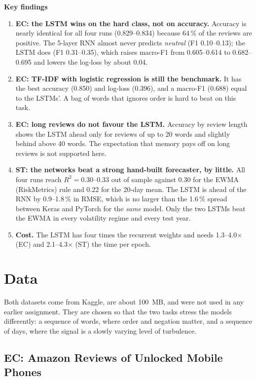 \documentclass[11pt, a4paper]{article}
\begin{document}
\textbf{Key findings}
\begin{enumerate}
\item \textbf{EC: the LSTM wins on the hard class, not on accuracy.} Accuracy is nearly identical for all four runs (0.829--0.834) because 64\,\% of the reviews are positive. The 5-layer RNN almost never
  predicts \emph{neutral} (F1 0.10--0.13); the LSTM does (F1 0.31--0.35), which raises macro-F1 from 0.605--0.614 to 0.682--0.695 and lowers the log-loss by about 0.04.
\item \textbf{EC: TF-IDF with logistic regression is still the benchmark.} It has the best accuracy (0.850) and log-loss (0.396), and a macro-F1 (0.688) equal to the LSTMs'. A bag of words that ignores order is hard to beat on this task.
\item \textbf{EC: long reviews do not favour the LSTM.} Accuracy by review length shows the LSTM ahead only for reviews of up to 20 words and slightly behind above 40 words. The expectation that memory pays off on long reviews is not supported here.
\item \textbf{ST: the networks beat a strong hand-built forecaster, by little.} All four runs reach $R^2=0.30$--$0.33$ out of sample against 0.30 for the EWMA (RiskMetrics) rule and 0.22 for the 20-day mean. The LSTM is ahead of the RNN by 0.9--1.8\,\% in RMSE,
  which is no larger than the 1.6\,\% spread between Keras and PyTorch for the \emph{same} model. Only the two LSTMs beat the EWMA in every volatility regime and every test year.
\item \textbf{Cost.} The LSTM has four times the recurrent weights and needs 1.3--4.0$\times$ (EC) and 2.1--4.3$\times$ (ST) the time per epoch.
\end{enumerate}



\section{Data}

Both datasets come from Kaggle, are about 100~MB, and were not used in any earlier assignment. They are chosen so that the two tasks stress the models differently: a sequence of words, where order and negation matter, and a sequence of days, where the signal is a slowly varying level of turbulence.

\subsection{EC: Amazon Reviews of Unlocked Mobile Phones}
\end{document}
